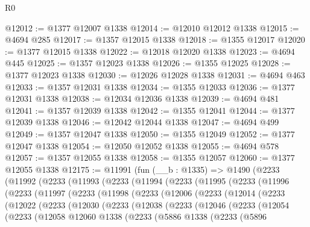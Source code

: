 \begin{lexlean}{R0}
\begin{coremodule}
@12012 := @1377 @12007 @1338
@12014 := @12010 @12012 @1338
@12015 := @4694 @285
@12017 := @1357 @12015 @1338
@12018 := @1355 @12017
@12020 := @1377 @12015 @1338
@12022 := @12018 @12020 @1338
@12023 := @4694 @445
@12025 := @1357 @12023 @1338
@12026 := @1355 @12025
@12028 := @1377 @12023 @1338
@12030 := @12026 @12028 @1338
@12031 := @4694 @463
@12033 := @1357 @12031 @1338
@12034 := @1355 @12033
@12036 := @1377 @12031 @1338
@12038 := @12034 @12036 @1338
@12039 := @4694 @481
@12041 := @1357 @12039 @1338
@12042 := @1355 @12041
@12044 := @1377 @12039 @1338
@12046 := @12042 @12044 @1338
@12047 := @4694 @499
@12049 := @1357 @12047 @1338
@12050 := @1355 @12049
@12052 := @1377 @12047 @1338
@12054 := @12050 @12052 @1338
@12055 := @4694 @578
@12057 := @1357 @12055 @1338
@12058 := @1355 @12057
@12060 := @1377 @12055 @1338
@12175 := @11991
    (fun (__b : @1335) =>
    @1490
      (@2233
        (@11992
          (@2233
            (@11993
              (@2233
                (@11994
                  (@2233
                    (@11995
                      (@2233
                        (@11996
                          (@2233
                            (@11997
                              (@2233
                                (@11998
                                  (@2233
                                    (@12006
                                      (@2233
                                        (@12014
                                          (@2233
                                            (@12022
                                              (@2233
                                                (@12030
                                                  (@2233
                                                    (@12038
                                                      (@2233
                                                        (@12046
                                                          (@2233
                                                            (@12054
                                                              (@2233
                                                                (@12058
                                                                  @12060
                                                                  @1338
                                                                  (@2233
                                                                    (@5886
                                                                      @1338
                                                                      (@2233
                                                                        (@5896

\end{coremodule}
\end{lexlean}
